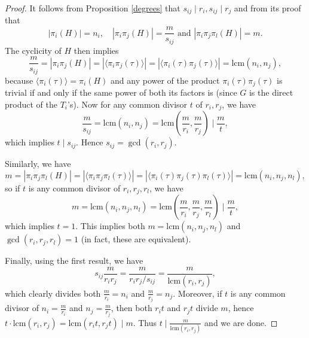 \documentclass[12pt,a4paper]{article}
\theoremstyle{definition}
\newcommand{\lcm}{\mathrm{lcm}}
\begin{document}
\begin{proof}
It follows from Proposition \ref{degrees} that $s_{ij}\mid r_i, s_{ij}\mid r_j$ and from its proof that $$|\pi_i(H)|=n_i, \quad |\pi_i\pi_j(H)|=\frac{m}{s_{ij}} \text{ and } |\pi_i\pi_j\pi_l(H)|=m.$$ The cyclicity of $H$ then implies
$$\frac{m}{s_{ij}}=|\pi_i\pi_j(H)|=|\langle\pi_i\pi_j(\tau)\rangle|=|\langle\pi_i(\tau)\pi_j(\tau)\rangle|=\lcm\left(n_i,n_j\right),$$
because $\langle\pi_i(\tau)\rangle=\pi_i(H)$ and any power of the product $\pi_i(\tau)\pi_j(\tau)$ is trivial if and only if the same power of both its factors is (since $G$ is the direct product of the $T_i$'s). 
Now for any common divisor $t$ of $r_i,r_j$, we have $$\frac{m}{s_{ij}}= \lcm\left(n_i,n_j\right)=\lcm\left(\frac{m}{r_i},\frac{m}{r_j}\right) \mid \frac{m}{t},$$ which implies $t\mid s_{ij}$. Hence $s_{ij}=\gcd(r_i,r_j)$.

Similarly, we have
$$m=|\pi_i\pi_j\pi_l(H)|=|\langle\pi_i\pi_j\pi_l(\tau)\rangle|=|\langle\pi_i(\tau)\pi_j(\tau)\pi_l(\tau)\rangle|=\lcm(n_i,n_j,n_l),$$
so if $t$ is any common divisor of $r_i,r_j,r_l$, we have $$m=\lcm(n_i,n_j,n_l)=\lcm\left(\frac{m}{r_i},\frac{m}{r_j},\frac{m}{r_l}\right) \mid \frac{m}{t},$$ which implies $t=1$. This implies both $m=\lcm(n_i,n_j,n_l)$ and $\gcd(r_i,r_j,r_l)=1$ (in fact, these are equivalent).

Finally, using the first result, we have $$s_{ij}\frac{m}{r_ir_j}=\frac{m}{r_ir_j/s_{ij}}=\frac{m}{\lcm(r_i,r_j)},$$ which clearly divides both $\frac{m}{r_i}=n_i$ and $\frac{m}{r_j}=n_j$. Moreover, if $t$ is any common divisor of $n_i=\frac{m}{r_i}$ and $n_j=\frac{m}{r_j}$, then both $r_it$ and $r_jt$ divide $m$, hence $t\cdot\lcm(r_i,r_j)=\lcm(r_it,r_jt)\mid m$. Thus $t\mid \frac{m}{\lcm(r_i,r_j)}$ and we are done.
\end{proof}
\end{document}
